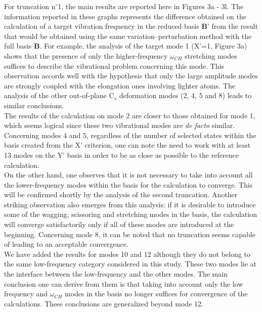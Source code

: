 	For truncation n$^{\circ}$1, the main results are reported here in Figures 3a - 3l. The information reported in these graphs represents the difference obtained on the calculation of a target vibration frequency in the reduced basis $\textbf{B’}$ from the result that would be obtained using the same variation–perturbation method with the full basis $\textbf{B}$. For example, the analysis of the target mode 1 (X’=1, Figure 3a) shows that the presence of only the higher-frequency $\omega_{CH}$ stretching modes suffices to describe the vibrational problem concerning this mode. This observation accords well with the hypothesis that only the large amplitude modes are strongly coupled with the elongation ones involving lighter atoms. The analysis of the other out-of-plane C$_{s}$ deformation modes (2, 4, 5 and 8) leads to similar conclusions.\\
	
	 The results of the calculation on mode 2 are closer to those obtained for mode 1, which seems logical since these two vibrational modes are \textit{de facto} similar. Concerning modes 4 and 5, regardless of the number of selected states within the basis created from the X’ criterion, one can note the need to work with at least 13 modes on the Y’ basis in order to be as close as possible to the reference calculation.\\
	 
	  On the other hand, one observes that it is not necessary to take into account all the lower-frequency modes within the basis for the calculation to converge. This will be confirmed shortly by the analysis of the second truncation. Another striking observation also emerges from this analysis: if it is desirable to introduce some of the wagging, scissoring and stretching modes in the basis, the calculation will converge satisfactorily only if all of these modes are introduced at the beginning. Concerning mode 8, it can be noted that no truncation seems capable of leading to an acceptable convergence.\\
	
	We have added the results for modes 10 and 12 although they do not belong to the same low-frequency category considered in this study. These two modes lie at the interface between the low-frequency and the other modes. The main conclusion one can derive from them is that taking into account only the low frequency and $\omega_{CH}$ modes in the basis no longer suffices for convergence of the calculations. These conclusions are generalized beyond mode 12.\\
	
